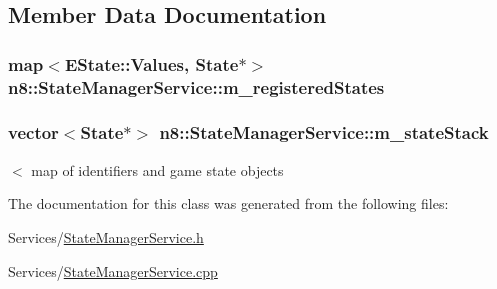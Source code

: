 \subsection{Member Data Documentation}
\hypertarget{classn8_1_1_state_manager_service_a8bc933661f9accae81f82c6e682068c0}{
\subsubsection[{m\-\_\-registered\-States}]{\setlength{\rightskip}{0pt plus 5cm}map$<${\bf E\-State\-::\-Values}, {\bf State}$\ast$$>$ n8\-::\-State\-Manager\-Service\-::m\-\_\-registered\-States\hspace{0.3cm}{\ttfamily [private]}}}\label{classn8_1_1_state_manager_service_a8bc933661f9accae81f82c6e682068c0}
\hypertarget{classn8_1_1_state_manager_service_a3ab9712018eebbfd3b99e406e9b004c0}{
\subsubsection[{m\-\_\-state\-Stack}]{\setlength{\rightskip}{0pt plus 5cm}vector$<${\bf State}$\ast$$>$ n8\-::\-State\-Manager\-Service\-::m\-\_\-state\-Stack\hspace{0.3cm}{\ttfamily [private]}}}\label{classn8_1_1_state_manager_service_a3ab9712018eebbfd3b99e406e9b004c0}
$<$ map of identifiers and game state objects 

The documentation for this class was generated from the following files\-:\begin{DoxyCompactItemize}
\item 
Services/\hyperlink{_state_manager_service_8h}{State\-Manager\-Service.\-h}\item 
Services/\hyperlink{_state_manager_service_8cpp}{State\-Manager\-Service.\-cpp}\end{DoxyCompactItemize}
